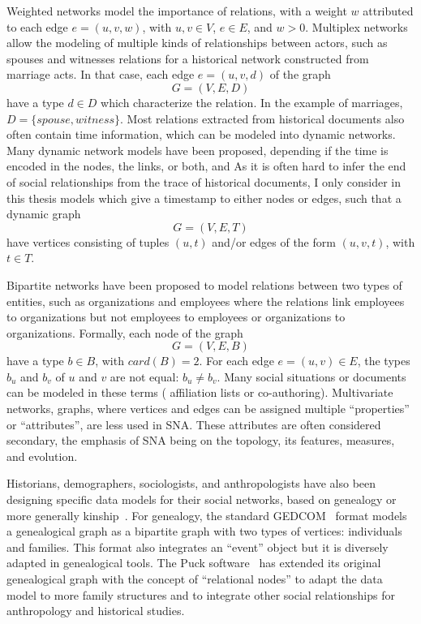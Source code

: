 Weighted networks model the importance of relations, with a weight $w$ attributed to each edge $e = (u, v, w)$, with $u, v \in V$, $e \in E$, and $w > 0$.
Multiplex networks allow the modeling of multiple kinds of relationships between actors, such as spouses and witnesses relations for a historical network constructed from marriage acts.
In that case, each edge $e = (u, v, d)$ of the graph
\begin{equation}
    G = (V, E, D)
\end{equation}
have a type $d \in D$ which characterize the relation. In the example of marriages, $D = \{spouse, witness\}$.
Most relations extracted from historical documents also often contain time information, which can be modeled into dynamic networks.
Many dynamic network models have been proposed\cite{rossettiCommunityDiscoveryDynamic2018}, depending if the time is encoded in the nodes, the links, or both, and 
As it is often hard to infer the end of social relationships from the trace of historical documents, I only consider in this thesis models which give a timestamp to either nodes or edges, such that a dynamic graph
\begin{equation}
    G = (V, E, T)
\end{equation}
have vertices consisting of tuples $(u, t)$ and/or edges of the form $(u, v, t)$, with $t \in T$.

Bipartite networks have been proposed to model relations between two types of entities, such as organizations and employees where the relations link employees to organizations but not employees to employees or organizations to organizations\cite{borgattiSocialNetworkAnalysis2009}.
Formally, each node of the graph
\begin{equation}
    G = (V, E, B)
\end{equation}
have a type $b \in B$, with $card(B) = 2$. For each edge $e = (u, v) \in E$, the types $b_u$ and $b_v$ of $u$ and $v$ are not equal: $b_u \neq b_v$.
Many social situations or documents can be modeled in these terms (%
affiliation lists or co-authoring).
Multivariate networks, \ie graphs, where vertices and edges can be assigned multiple ``properties'' or ``attributes'', are less used in SNA\@.
These attributes are often considered secondary, the emphasis of SNA being on the topology, its features, measures, and evolution.

Historians, demographers, sociologists, and anthropologists have also been designing specific data models for their social networks, based on genealogy or more generally kinship~\cite{hambergerKinshipNetworkAnalysis2011}.
For genealogy, the standard GEDCOM~\cite{gedcom} format models a genealogical graph as a bipartite graph with two types of vertices: individuals and families.
This format also integrates an ``event'' object but it is diversely adapted in genealogical tools.
The Puck software~\cite{hambergerScanningPatternsRelationship2014} has extended its original genealogical graph with the concept of ``relational nodes'' to adapt the data model to more family structures and to integrate other social relationships for anthropology and historical studies.

